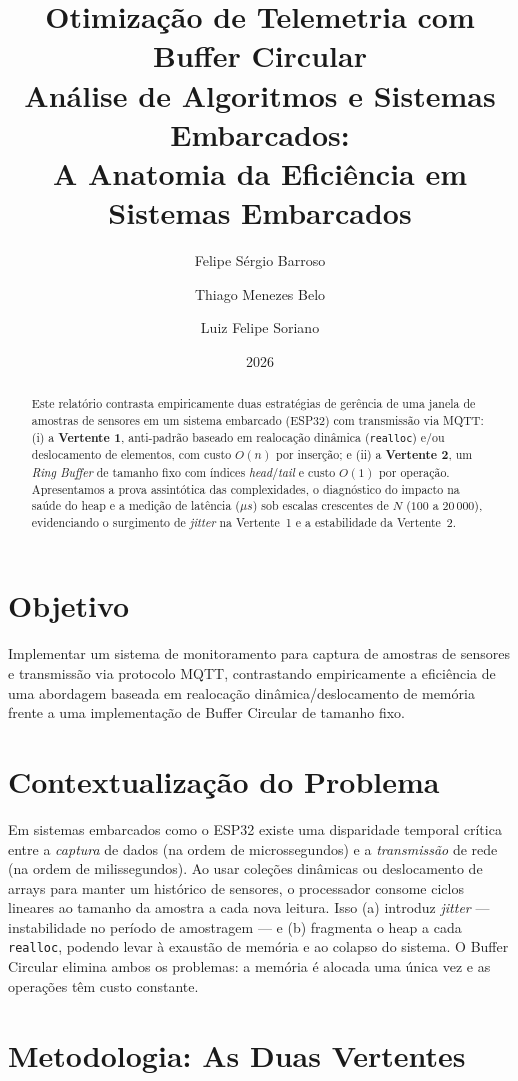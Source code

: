 \documentclass[11pt,a4paper]{article}
\title{\textbf{Otimização de Telemetria com Buffer Circular}\\[0.3em]
\large Análise de Algoritmos e Sistemas Embarcados:\\ A Anatomia da Eficiência em Sistemas Embarcados}
\author{Felipe Sérgio Barroso \and Thiago Menezes Belo \and Luiz Felipe Soriano}
\date{2026}
\begin{document}
\maketitle

\begin{abstract}
Este relatório contrasta empiricamente duas estratégias de gerência de uma
janela de amostras de sensores em um sistema embarcado (ESP32) com transmissão
via MQTT: (i) a \textbf{Vertente 1}, anti-padrão baseado em realocação
dinâmica (\texttt{realloc}) e/ou deslocamento de elementos, com custo
$O(n)$ por inserção; e (ii) a \textbf{Vertente 2}, um \emph{Ring Buffer} de
tamanho fixo com índices \emph{head}/\emph{tail} e custo $O(1)$ por operação.
Apresentamos a prova assintótica das complexidades, o diagnóstico do impacto na
saúde do heap e a medição de latência ($\mu s$) sob escalas crescentes de $N$
($100$ a $20\,000$), evidenciando o surgimento de \emph{jitter} na Vertente~1 e
a estabilidade da Vertente~2.
\end{abstract}

\section{Objetivo}
Implementar um sistema de monitoramento para captura de amostras de sensores e
transmissão via protocolo MQTT, contrastando empiricamente a eficiência de uma
abordagem baseada em realocação dinâmica/deslocamento de memória frente a uma
implementação de Buffer Circular de tamanho fixo.

\section{Contextualização do Problema}
Em sistemas embarcados como o ESP32 existe uma disparidade temporal crítica
entre a \emph{captura} de dados (na ordem de microssegundos) e a
\emph{transmissão} de rede (na ordem de milissegundos). Ao usar coleções
dinâmicas ou deslocamento de arrays para manter um histórico de sensores, o
processador consome ciclos lineares ao tamanho da amostra a cada nova leitura.
Isso (a) introduz \emph{jitter} --- instabilidade no período de amostragem ---
e (b) fragmenta o heap a cada \texttt{realloc}, podendo levar à exaustão de
memória e ao colapso do sistema. O Buffer Circular elimina ambos os problemas:
a memória é alocada uma única vez e as operações têm custo constante.

\section{Metodologia: As Duas Vertentes}
\end{document}

